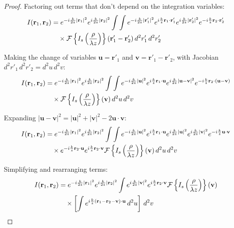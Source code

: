 \documentclass[10pt,a4paper]{amsart}
\begin{document}
\begin{proof}
Factoring out terms that don't depend on the integration variables:
\begin{align}
I(\mathbf{r}_1, \mathbf{r}_2) &= e^{-i\frac{k}{2z}|\mathbf{r}_1|^2} e^{i\frac{k}{2z}|\mathbf{r}_2|^2} \int\int e^{-i\frac{k}{2z}|\mathbf{r}'_1|^2} e^{i\frac{k}{z}\mathbf{r}_1 \cdot \mathbf{r}'_1} e^{i\frac{k}{2z}|\mathbf{r}'_2|^2} e^{-i\frac{k}{z}\mathbf{r}_2 \cdot \mathbf{r}'_2} \\
&\quad \times \mathcal{F}\left\{I_s\left(\frac{\mathbf{\rho}}{\lambda z}\right)\right\}(\mathbf{r}'_1 - \mathbf{r}'_2) \, d^2r'_1 \, d^2r'_2 \notag
\end{align}

Making the change of variables $\mathbf{u} = \mathbf{r}'_1$ and $\mathbf{v} = \mathbf{r}'_1 - \mathbf{r}'_2$, with Jacobian $d^2r'_1 \, d^2r'_2 = d^2u \, d^2v$:
\begin{align}
I(\mathbf{r}_1, \mathbf{r}_2) &= e^{-i\frac{k}{2z}|\mathbf{r}_1|^2} e^{i\frac{k}{2z}|\mathbf{r}_2|^2} \int\int e^{-i\frac{k}{2z}|\mathbf{u}|^2} e^{i\frac{k}{z}\mathbf{r}_1 \cdot \mathbf{u}} e^{i\frac{k}{2z}|\mathbf{u}-\mathbf{v}|^2} e^{-i\frac{k}{z}\mathbf{r}_2 \cdot (\mathbf{u}-\mathbf{v})} \\
&\quad \times \mathcal{F}\left\{I_s\left(\frac{\mathbf{\rho}}{\lambda z}\right)\right\}(\mathbf{v}) \, d^2u \, d^2v \notag
\end{align}

Expanding $|\mathbf{u}-\mathbf{v}|^2 = |\mathbf{u}|^2 + |\mathbf{v}|^2 - 2\mathbf{u} \cdot \mathbf{v}$:
\begin{align}
I(\mathbf{r}_1, \mathbf{r}_2) &= e^{-i\frac{k}{2z}|\mathbf{r}_1|^2} e^{i\frac{k}{2z}|\mathbf{r}_2|^2} \int\int e^{-i\frac{k}{2z}|\mathbf{u}|^2} e^{i\frac{k}{z}\mathbf{r}_1 \cdot \mathbf{u}} e^{i\frac{k}{2z}|\mathbf{u}|^2} e^{i\frac{k}{2z}|\mathbf{v}|^2} e^{-i\frac{k}{z}\mathbf{u} \cdot \mathbf{v}} \\
&\quad \times e^{-i\frac{k}{z}\mathbf{r}_2 \cdot \mathbf{u}} e^{i\frac{k}{z}\mathbf{r}_2 \cdot \mathbf{v}} \mathcal{F}\left\{I_s\left(\frac{\mathbf{\rho}}{\lambda z}\right)\right\}(\mathbf{v}) \, d^2u \, d^2v \notag
\end{align}

Simplifying and rearranging terms:
\begin{align}
I(\mathbf{r}_1, \mathbf{r}_2) &= e^{-i\frac{k}{2z}|\mathbf{r}_1|^2} e^{i\frac{k}{2z}|\mathbf{r}_2|^2} \int e^{i\frac{k}{2z}|\mathbf{v}|^2} e^{i\frac{k}{z}\mathbf{r}_2 \cdot \mathbf{v}} \mathcal{F}\left\{I_s\left(\frac{\mathbf{\rho}}{\lambda z}\right)\right\}(\mathbf{v}) \\
&\quad \times \left[\int e^{i\frac{k}{z}(\mathbf{r}_1-\mathbf{r}_2-\mathbf{v}) \cdot \mathbf{u}} \, d^2u \right] \, d^2v \notag
\end{align}


\end{proof}
\end{document}
